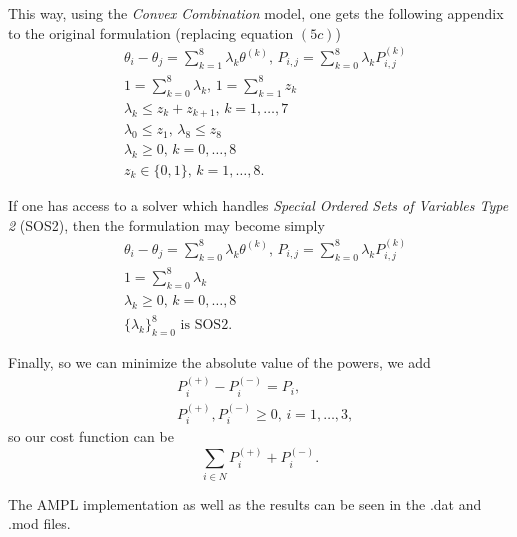 \documentclass[a4paper]{report}
\begin{document}
This way, using the \emph{Convex Combination} model, one gets the following appendix to the original formulation (replacing equation $\left( 5c \right) $)
\begin{align*}
    & \theta_i - \theta_j = \sum_{k=1}^{8} \lambda_k \theta^{(k)},\, P_{i,j} = \sum_{k=0}^{8} \lambda_k P^{(k)}_{i,j} \\
    & 1 = \sum_{k=0}^{8} \lambda_k,\, 1 = \sum_{k=1}^{8} z_k \\
    & \lambda_k \le z_k + z_{k+1},\, k=1,\ldots,7 \\
    & \lambda_{0} \le z_1,\, \lambda_8 \le z_8 \\
    & \lambda_k \ge 0,\, k=0,\ldots,8 \\ 
    & z_k \in \{0,1\},\, k=1,\ldots,8
.\end{align*}

If one has access to a solver which handles \emph{Special Ordered Sets of Variables Type 2} (SOS2), then the formulation may become simply
\begin{align*}
    & \theta_i - \theta_j = \sum_{k=0}^{8} \lambda_k \theta^{(k)},\, P_{i,j} = \sum_{k=0}^{8} \lambda_k P^{(k)}_{i,j} \\
    & 1 = \sum_{k=0}^{8} \lambda_k \\
    & \lambda_k \ge 0,\, k=0,\ldots,8 \\
    & \{\lambda_k \}_{k=0}^{8} \text{ is SOS2}
.\end{align*}

Finally, so we can minimize the absolute value of the powers, we add
\begin{align*}
    & P_i^{(+)} - P_i^{(-)} = P_i, \\
    & P_i^{(+)}, P_i^{(-)} \ge 0,\, i = 1,\ldots,3
,\end{align*}
so our cost function can be \[
\sum_{i\in N} P_i^{(+)} + P_i^{(-)}
.\]

The AMPL implementation as well as the results can be seen in the .dat and .mod files.
\end{document}

